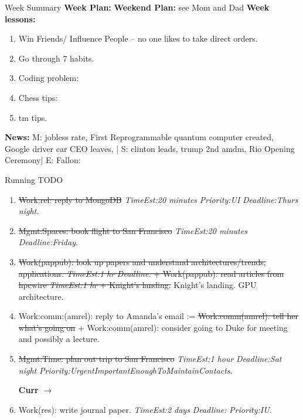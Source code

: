 \documentclass[serif, mathserif, final]{beamer}
\newcommand{\doneTaskNoItem}[1]{\sout{#1}}
\newcommand{\doneTask}[1]{\tiny \item \tiny \sout{#1}}
\newcommand{\te}[1]{\textit{TimeEst:}\textit{#1}}
\newcommand{\dl}[1]{\textit{Deadline:}\textit{#1}}
\newcommand{\pr}[1]{\textit{Priority:}\textit{#1}}
\begin{document}
\begin{frame}
\begin{columns}

\begin{column}{0.5\linewidth} 
      \begin{block}{Week Summary}
        {\tiny \textbf{Week Plan:}  }
        {\tiny \textbf{Weekend Plan:} see Mom and Dad}
        {\tiny {\bf Week lessons:}}
        \begin{enumerate}
          \tiny \item \tiny Win Friends/ Influence People – no one
          likes to take direct orders.
        \item \tiny Go through 7 habits.
        \item \tiny Coding problem: 
        \item \tiny Chess tips: 
        \item \tiny tm tips.
        \end{enumerate} 

        {{\tiny \bf News:} M: jobless rate, First Reprogrammable
          quantum computer created, Google driver car CEO leaves, | S:
          clinton leads, trump 2nd amdm,  Rio Opening Ceremony| E:
          Fallon: }

      \begin{block}{Running TODO} %
        \begin{enumerate}

          \doneTask{Work:rel: reply to MongoDB} \te{20 minutes}
          \pr{UI} \dl{Thurs night}. 

                 \doneTask{Mgmt:Spaces: book flight to San Francisco} \te{20
          minutes} \dl{Friday}. 
        
        \doneTask{ Work(pappub): look up papers and understand
          architectures/trends, applications. \te{1 hr} \dl{} +
          Work(pappub): read articles from hpcwire \te{1 hr} + Knight's
          landing.}      
        Knight's landing. 
        GPU architecture. 
        
      \item \tiny Work:comm:(amrel): reply to Amanda's email :=
        \doneTaskNoItem{Work:comm(amrel): tell her what's going on} +
        Work:comm(amrel): consider going to Duke for meeting and
        possibly a lecture. \doneTask{Mgmt:Time: plan out trip to San
          Francisco} \te{1 hour} \dl{Sat night}
        \pr{UrgentImportantEnoughToMaintainContacts}. 

        \textbf{Curr} $\rightarrow$ 
      \item \tiny Work(res): write journal paper. \te{2 days} \dl{}
        \pr{IU}. 
        

\end{enumerate}
\end{block}
\end{block}
\end{column}
\end{columns}
\end{frame}
\end{document}
